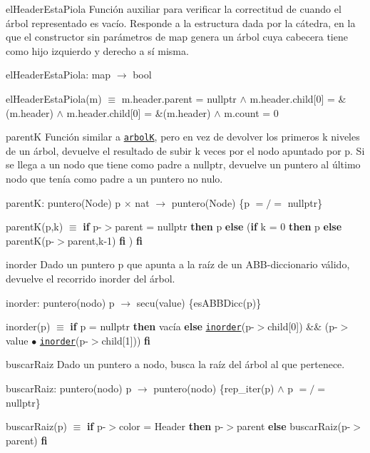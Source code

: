\begin{DoxyParagraph}{el\-Header\-Esta\-Piola}
Función auxiliar para verificar la correctitud de  cuando el árbol representado es vacío. Responde a la estructura dada por la cátedra, en la que el constructor sin parámetros de map genera un árbol cuya cabecera tiene como hijo izquierdo y derecho a sí misma.

el\-Header\-Esta\-Piola\-: map $\to$ bool \par
 el\-Header\-Esta\-Piola(m) $\equiv$ m.\-header.\-parent = nullptr $\land$ m.\-header.\-child\mbox{[}0\mbox{]} = \&(m.\-header) $\land$ m.\-header.\-child\mbox{[}0\mbox{]} = \&(m.\-header) $\land$ m.\-count = 0


\end{DoxyParagraph}
\begin{DoxyParagraph}{parent\-K}
Función similar a \href{axiomas.html#arbolK}{\tt arbol\-K}, pero en vez de devolver los primeros k niveles de un árbol, devuelve el resultado de subir k veces por el nodo apuntado por p. Si se llega a un nodo que tiene como padre a nullptr, devuelve un puntero al último nodo que tenía como padre a un puntero no nulo.

parent\-K\-: puntero(\-Node) p $\times$ nat $\to$ puntero(\-Node) \{p $=/=$ nullptr\} \par
 parent\-K(p,k) $\equiv$ {\bfseries if} p-\/$>$parent = nullptr {\bfseries then} p {\bfseries else} ({\bfseries if} k = 0 {\bfseries then} p {\bfseries else} parent\-K(p-\/$>$parent,k-\/1) {\bfseries fi} ) {\bfseries fi} 


\end{DoxyParagraph}
\begin{DoxyParagraph}{inorder}
Dado un puntero p que apunta a la raíz de un A\-B\-B-\/diccionario válido, devuelve el recorrido inorder del árbol.

inorder\-: puntero(nodo) p $\to$ secu(value) \{es\-A\-B\-B\-Dicc(p)\} \par
 inorder(p) $\equiv$ {\bfseries if} p = nullptr {\bfseries then} vacía {\bfseries else} \href{axiomas.html#inorder}{\tt inorder}(p-\/$>$child\mbox{[}0\mbox{]}) \&\& (p-\/$>$value $\bullet$ \href{axiomas.html#inorder}{\tt inorder}(p-\/$>$child\mbox{[}1\mbox{]})) {\bfseries fi} 


\end{DoxyParagraph}
\begin{DoxyParagraph}{buscar\-Raiz}
Dado un puntero a nodo, busca la raíz del árbol al que pertenece.

buscar\-Raiz\-: puntero(nodo) p $\to$ puntero(nodo) \{rep\-\_\-iter(p) $\land$ p $=/=$ nullptr\} \par
 buscar\-Raiz(p) $\equiv$ {\bfseries if} p-\/$>$color = Header {\bfseries then} p-\/$>$parent {\bfseries else} buscar\-Raiz(p-\/$>$parent) {\bfseries fi} 


\end{DoxyParagraph}
